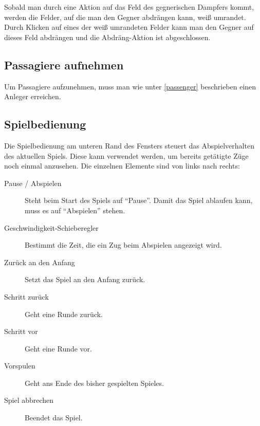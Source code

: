 \documentclass[12pt,a4paper, ngerman, oneside]{scrartcl}
\begin{document}
Sobald man durch eine Aktion auf das Feld des gegnerischen Dampfers kommt,
werden die Felder, auf die man den Gegner abdrängen kann, weiß umrandet. Durch
Klicken auf eines der weiß umrandeten Felder kann man den Gegner auf dieses Feld
abdrängen und die Abdräng-Aktion ist abgeschlossen.

\subsection{Passagiere aufnehmen}

Um Passagiere aufzunehmen, muss man wie unter \ref{passenger} beschrieben einen
Anleger erreichen.

\subsection{Spielbedienung}

Die Spielbedienung am unteren Rand des Fensters steuert das Abspielverhalten des
aktuellen Spiels. Diese kann verwendet werden, um bereits getätigte Züge
noch einmal anzusehen. Die einzelnen Elemente sind von links nach rechts:

\begin{description}
\item [Pause / Abspielen] Steht beim Start des Spiels auf ``Pause''. Damit das Spiel ablaufen kann, muss es auf ``Abspielen'' stehen.
\item [Geschwindigkeit-Schieberegler] Bestimmt die Zeit, die ein Zug beim Abspielen angezeigt wird.
\item [Zurück an den Anfang] Setzt das Spiel an den Anfang zurück.
\item [Schritt zurück] Geht eine Runde zurück.
\item [Schritt vor] Geht eine Runde vor.
\item [Vorspulen] Geht ans Ende des bisher gespielten Spieles.
\item [Spiel abbrechen] Beendet das Spiel.
\end{description}
\end{document}
